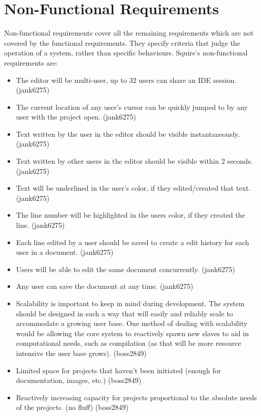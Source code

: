 \documentclass[11pt]{report}
\begin{document}
\section{Non-Functional Requirements}
    Non-functional requirements cover all the remaining requirements which are not covered by the functional requirements. They specify criteria that judge the operation of a system, rather than specific behaviours. Squire's non-functional requirements are:
    \begin{itemize}
            \item The editor will be multi-user, up to 32 users can share an IDE session. (jank6275)
            \item The current location of any user's cursor can be quickly jumped to by any user with the project open. (jank6275)
            \item Text written by the user in the editor should be visible instantaneously. (jank6275)
            \item Text written by other users in the editor should be visible within 2 seconds. (jank6275)
            \item Text will be underlined in the user's color, if they edited/created that text. (jank6275)
            \item The line number will be highlighted in the users color, if they created the line. (jank6275)
            \item Each line edited by a user should be saved to create a edit history for each user in a document. (jank6275)
            \item Users will be able to edit the same document concurrently. (jank6275)
            \item Any user can save the document at any time. (jank6275)
            \item Scalability is important to keep in mind during development. The system should be designed in such a way that will easily and reliably scale to accommodate a growing user base. One method of dealing with scalability would be allowing the core system to reactively spawn new slaves to aid in computational needs, such as compilation (as that will be more resource intensive the user base grows). (boss2849)
            \item Limited space for projects that haven't been initiated (enough for documentation, images, etc.) (boss2849)
            \item Reactively increasing capacity for projects proportional to the absolute needs of the projects. (no fluff) (boss2849)

\end{itemize}
\end{document}
